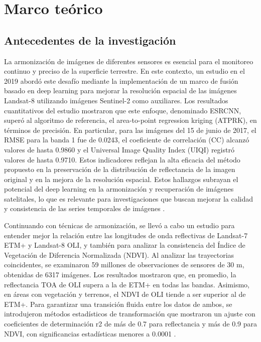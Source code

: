 \Chapter{}
\chapter{Marco teórico}
   \section{Antecedentes de la investigación}
        La armonización de imágenes de diferentes sensores es esencial para el monitoreo continuo y preciso de la superficie terrestre. En este contexto, un estudio en el 2019 abordó este desafío mediante la implementación de un marco de fusión basado en deep learning para mejorar la resolución espacial de las imágenes Landsat-8 utilizando imágenes Sentinel-2 como auxiliares. Los resultados cuantitativos del estudio mostraron que este enfoque, denominado ESRCNN, superó al algoritmo de referencia, el area-to-point regression kriging (ATPRK), en términos de precisión. En particular, para las imágenes del 15 de junio de 2017, el RMSE para la banda 1 fue de 0.0243, el coeficiente de correlación (CC) alcanzó valores de hasta 0.9860 y el Universal Image Quality Index (UIQI) registró valores de hasta 0.9710. Estos indicadores reflejan la alta eficacia del método propuesto en la preservación de la distribución de reflectancia de la imagen original y en la mejora de la resolución espacial. Estos hallazgos subrayan el potencial del deep learning en la armonización y recuperación de imágenes satelitales, lo que es relevante para investigaciones que buscan mejorar la calidad y consistencia de las series temporales de imágenes \autocite{shao2019deep}.

        Continuando con técnicas de armonización, se llevó a cabo un estudio para entender mejor la relación entre las longitudes de onda reflectivas de Landsat-7 ETM+ y Landsat-8 OLI, y también para analizar la consistencia del Índice de Vegetación de Diferencia Normalizada (NDVI). Al analizar las trayectorias coincidentes, se examinaron 59 millones de observaciones de sensores de 30 m, obtenidas de 6317 imágenes. Los resultados mostraron que, en promedio, la reflectancia TOA de OLI supera a la de ETM+ en todas las bandas. Asimismo, en áreas con vegetación y terrenos, el NDVI de OLI tiende a ser superior al de ETM+. Para garantizar una transición fluida entre los datos de ambos, se introdujeron métodos estadísticos de transformación que mostraron un ajuste con coeficientes de determinación r2 de más de 0.7 para reflectancia y más de 0.9 para NDVI, con significancias estadísticas menores a 0.0001 \autocite{roy2016characterization}.
        
